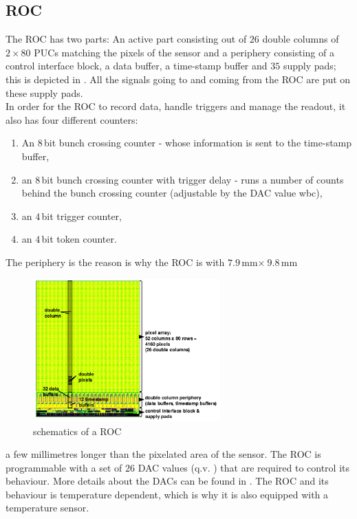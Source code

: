\documentclass[british,11pt,a4paper]{memoir}
\begin{document}
\subsection{\acs{ROC}}\label{sroc}
The \ac{ROC} has two parts: An active part consisting out of $26$ double columns of $2\times80$ \ac{PUC}s matching the pixels of the sensor and a periphery consisting of a control interface block, a data buffer, a time-stamp buffer and $35$ supply pads; this is depicted in . All the signals going to and coming from the \ac{ROC} are put on these supply pads.\\
In order for the \ac{ROC} to record data, handle triggers and manage the readout, it also has four different counters:
\begin{enumerate}
	\item An $8\,$bit bunch crossing counter - whose information is sent to the time-stamp buffer,
	\item an $8\,$bit bunch crossing counter with trigger delay - runs a number of counts behind the bunch crossing counter (adjustable by the \ac{DAC} value wbc),
	\item an $4\,$bit trigger counter,
	\item an $4\,$bit token counter.
\end{enumerate}\par
The periphery is the reason is why the \ac{ROC} is with $7.9\,$mm$\times\ 9.8\,$mm 
\begin{figure}
	\vspace*{-10pt}
	\includegraphics[width=7.2cm]{ROC_scheme}
	\caption{schematics of a \ac{ROC} \cite{psi46chip}}
	\label{p8}
	\vspace*{-5pt}
\end{figure}  
a few millimetres longer than the pixelated area of the sensor. The \ac{ROC} is programmable with a set of  $26$ \ac{DAC} values (q.v. ) that are required to control its behaviour. More details about the \ac{DAC}s can be found in . The \ac{ROC} and its behaviour is temperature dependent, which is why it is also equipped with a temperature sensor.\\
\end{document}
